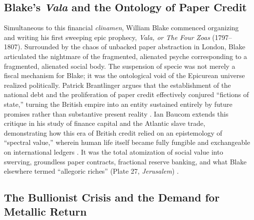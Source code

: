 \documentclass[
]{article}
\begin{document}
\subsection{\texorpdfstring{Blake's \emph{Vala} and the Ontology of
Paper
Credit}{Blake's Vala and the Ontology of Paper Credit}}\label{blakes-vala-and-the-ontology-of-paper-credit}

Simultaneous to this financial \emph{clinamen}, William Blake commenced
organizing and writing his first sweeping epic prophecy, \emph{Vala, or
The Four Zoas} (1797--1807). Surrounded by the chaos of unbacked paper
abstraction in London, Blake articulated the nightmare of the
fragmented, alienated psyche corresponding to a fragmented, alienated
social body. The suspension of specie was not merely a fiscal mechanism
for Blake; it was the ontological void of the Epicurean universe
realized politically. Patrick Brantlinger argues that the establishment
of the national debt and the proliferation of paper credit effectively
conjured ``fictions of state,'' turning the British empire into an
entity sustained entirely by future promises rather than substantive
present reality \citep{brantlinger1996fictions, tooke1838history}. Ian
Baucom extends this critique in his study of finance capital and the
Atlantic slave trade, demonstrating how this era of British credit
relied on an epistemology of ``spectral value,'' wherein human life
itself became fully fungible and exchangeable on international ledgers
\citep{baucom2005specters}. It was the total atomization of social value
into swerving, groundless paper contracts, fractional reserve banking,
and what Blake elsewhere termed ``allegoric riches'' (Plate 27,
\emph{Jerusalem}) \citep{makdisi2003william, erdman1988complete}.

\subsection{The Bullionist Crisis and the Demand for Metallic
Return}\label{the-bullionist-crisis-and-the-demand-for-metallic-return}
\end{document}
